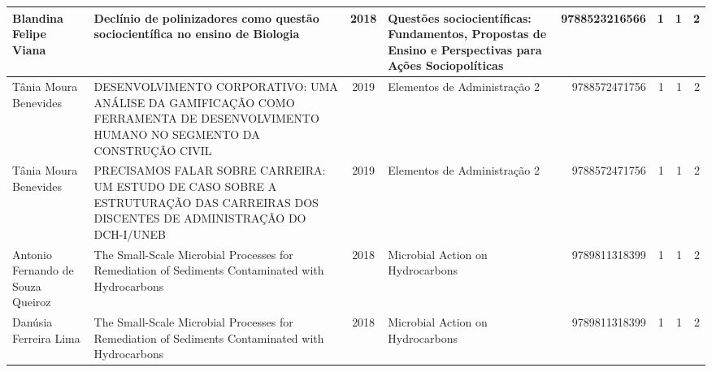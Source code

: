 \documentclass[12pt,brazil]{article}\usepackage[]{graphicx}\usepackage[]{xcolor}
\makeatletter
\newenvironment{kframe}{%
 \def\at@end@of@kframe{}%
 \ifinner\ifhmode%
  \def\at@end@of@kframe{\end{minipage}}%
  \begin{minipage}{\columnwidth}%
 \fi\fi%
 \def\FrameCommand##1{\hskip\@totalleftmargin \hskip-\fboxsep
 \colorbox{shadecolor}{##1}\hskip-\fboxsep
     \hskip-\linewidth \hskip-\@totalleftmargin \hskip\columnwidth}%
 \MakeFramed {\advance\hsize-\width
   \@totalleftmargin\z@ \linewidth\hsize
   \@setminipage}}%
 {\par\unskip\endMakeFramed%
 \at@end@of@kframe}
\makeatother
\begin{document}
\begin{longtable}{|E{3cm}|E{6cm}|c|E{5cm}|r|r|r|r|}
\hline
Blandina Felipe Viana & Declínio de polinizadores como questão sociocientífica no ensino de Biologia & 2018 & Questões sociocientíficas: Fundamentos, Propostas de Ensino e Perspectivas para Ações Sociopolíticas & 9788523216566 & 1 & 1 & 2 \\
\hline
Tânia Moura Benevides & DESENVOLVIMENTO CORPORATIVO: UMA ANÁLISE DA GAMIFICAÇÃO COMO FERRAMENTA DE DESENVOLVIMENTO HUMANO NO SEGMENTO DA CONSTRUÇÃO CIVIL & 2019 & Elementos de Administração 2 & 9788572471756 & 1 & 1 & 2 \\
\hline
Tânia Moura Benevides & PRECISAMOS FALAR SOBRE CARREIRA: UM ESTUDO DE CASO SOBRE A ESTRUTURAÇÃO DAS CARREIRAS DOS DISCENTES DE ADMINISTRAÇÃO DO DCH-I/UNEB & 2019 & Elementos de Administração 2 & 9788572471756 & 1 & 1 & 2 \\
\hline
Antonio Fernando de Souza Queiroz & The Small-Scale Microbial Processes for Remediation of Sediments Contaminated with Hydrocarbons & 2018 & Microbial Action on Hydrocarbons & 9789811318399 & 1 & 1 & 2 \\
\hline
Danúsia Ferreira Lima & The Small-Scale Microbial Processes for Remediation of Sediments Contaminated with Hydrocarbons & 2018 & Microbial Action on Hydrocarbons & 9789811318399 & 1 & 1 & 2 \\
\hline

\end{longtable}

\clearpage

\begin{kframe}


{\ttfamily\noindent\bfseries\color{errorcolor}{\#\# Error in eval(expr, envir, enclos): objeto 'proddet' não encontrado}}

{\ttfamily\noindent\bfseries\color{errorcolor}{\#\# Error in eval(expr, envir, enclos): objeto 'proddet' não encontrado}}\end{kframe}

\small
\label{tab:proddet}
\begin{kframe}


{\ttfamily\noindent\bfseries\color{errorcolor}{\#\# Error in eval(expr, envir, enclos): objeto 'proddet' não encontrado}}

{\ttfamily\noindent\bfseries\color{errorcolor}{\#\# Error: objeto 'prddt' não encontrado}}

{\ttfamily\noindent\bfseries\color{errorcolor}{\#\# Error in eval(expr, envir, enclos): objeto 'prddt' não encontrado}}\end{kframe}
\normalsize
\end{document}
